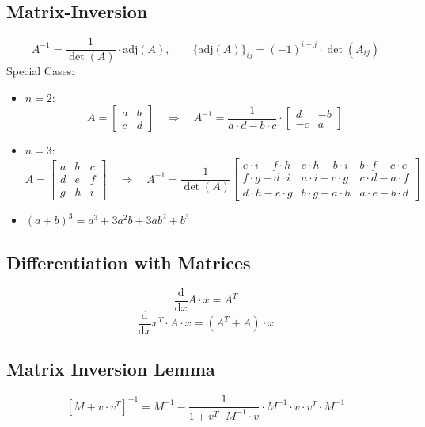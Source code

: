 \documentclass[a4paper,12 pt]{article}
\numberwithin{equation}{section}
\theoremstyle{definition}
\theoremstyle{remark}
\theoremstyle{definition}
\theoremstyle{definition}
\theoremstyle{definition}
\theoremstyle{remark}
\newcommand{\dd}[2]{\frac{\text{d}#1}{\text{d}#2}}
\begin{document}
\subsection{Matrix-Inversion}\label{matrixinversion}
\begin{equation*}
A^{-1}=\frac{1}{\det(A)}\cdot\text{adj}(A),\qquad
\{\text{adj}(A)\}_{ij}=(-1)^{i+j}\cdot \det(A_{ij})
\end{equation*}
Special Cases:
\begin{itemize}
\item $n=2$:
\begin{equation*}
A=\begin{bmatrix} a & b \\ c & d \end{bmatrix} \quad \Rightarrow \quad 
A^{-1}=\frac{1}{a\cdot d-b\cdot c}\cdot\begin{bmatrix} d & -b \\ -c & a\end{bmatrix}
\end{equation*}
\item $n=3$:
\begin{equation*}
 A=
\begin {bmatrix}
	a & b & c \\
	d & e & f \\
	g & h & i
\end {bmatrix}\quad \Rightarrow \quad 
A^{-1}= \frac{1}{\det(A)}
\begin{bmatrix}
	e\cdot i-f\cdot h & c\cdot h-b\cdot i & b\cdot f-c\cdot e \\
	f\cdot g-d\cdot i & a\cdot i-c\cdot g & c\cdot d-a\cdot f \\
	d\cdot h-e\cdot g & b\cdot g-a\cdot h & a\cdot e-b\cdot d
\end{bmatrix}
\end{equation*}
\item $(a+b)^3=a^3+3a^2b+3ab^2+b^3$
\end{itemize}

\subsection{Differentiation with Matrices}
\[\dd{}{x} A\cdot x = A^T \]
\[ \dd{}{x} x^T \cdot A \cdot x = (A^T + A)\cdot x\]
\subsection{Matrix Inversion Lemma}\label{minvlemma}
\[[M+ v\cdot v^T]^{-1} = M^{-1} - \frac{1}{1+v^T\cdot M^{-1}\cdot v}\cdot M^{-1}\cdot v \cdot v^T \cdot M^{-1}\]
\end{document}
